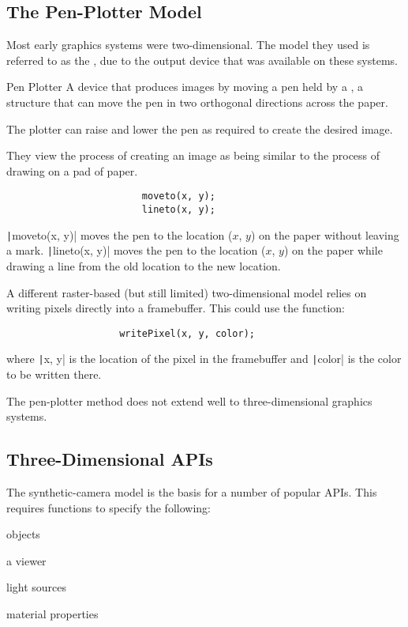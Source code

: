 \documentclass[\main/notes.tex]{subfiles}
\begin{document}
			\subsection{The Pen-Plotter Model}
				Most early graphics systems were two-dimensional.
				The model they used is referred to as the \mbox{},
				due to the output device that was available on these systems.

				\begin{definition}{Pen Plotter}
					A device that produces images by moving a pen held by a ,
					a structure that can move the pen in two orthogonal directions across the paper.

					The plotter can raise and lower the pen as required to create the desired image.

					They view the process of creating an image as being similar to the process of
					drawing on a pad of paper.
				\end{definition}

				\begin{example}
					\begin{verbatim}
						moveto(x, y);
						lineto(x, y);
					\end{verbatim}
					\texttt|moveto(x, y)| moves the pen to the location ($x$, $y$)
					on the paper without leaving a mark.
					\texttt|lineto(x, y)| moves the pen to the location ($x$, $y$)
					on the paper while drawing a line from the old location to the new location.
				\end{example}

				A different raster-based (but still limited) two-dimensional model
				relies on writing pixels directly into a framebuffer.
				This could use the function:
				\begin{verbatim}
					writePixel(x, y, color);
				\end{verbatim}
				where \texttt|x, y| is the location of the pixel in the framebuffer
				and \texttt|color| is the color to be written there.

				The pen-plotter method does not extend well to three-dimensional graphics systems.

			\subsection{Three-Dimensional APIs}
				The synthetic-camera model is the basis for a number of popular APIs.
				This requires functions to specify the following:
				\begin{center}
					\begin{itemize*}[itemjoin=\quad]
						\item objects
						\item a viewer
						\item light sources
						\item material properties
					\end{itemize*}
				\end{center}
\end{document}

